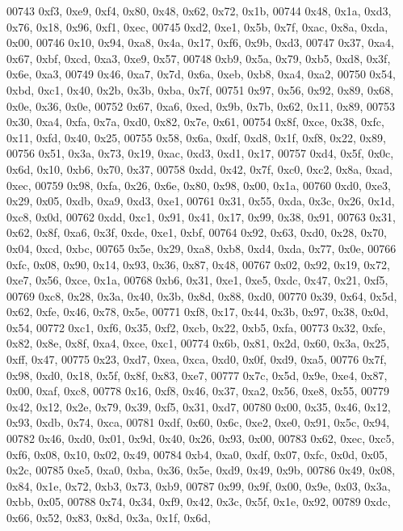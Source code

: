 \begin{DoxyCode}
00743   0xf3, 0xe9, 0xf4, 0x80, 0x48, 0x62, 0x72, 0x1b,
00744   0x48, 0x1a, 0xd3, 0x76, 0x18, 0x96, 0xf1, 0xec,
00745   0xd2, 0xe1, 0x5b, 0x7f, 0xac, 0x8a, 0xda, 0x00,
00746   0x10, 0x94, 0xa8, 0x4a, 0x17, 0xf6, 0x9b, 0xd3,
00747   0x37, 0xa4, 0x67, 0xbf, 0xcd, 0xa3, 0xe9, 0x57,
00748   0xb9, 0x5a, 0x79, 0xb5, 0xd8, 0x3f, 0x6e, 0xa3,
00749   0x46, 0xa7, 0x7d, 0x6a, 0xeb, 0xb8, 0xa4, 0xa2,
00750   0x54, 0xbd, 0xc1, 0x40, 0x2b, 0x3b, 0xba, 0x7f,
00751   0x97, 0x56, 0x92, 0x89, 0x68, 0x0e, 0x36, 0x0e,
00752   0x67, 0xa6, 0xed, 0x9b, 0x7b, 0x62, 0x11, 0x89,
00753   0x30, 0xa4, 0xfa, 0x7a, 0xd0, 0x82, 0x7e, 0x61,
00754   0x8f, 0xce, 0x38, 0xfc, 0x11, 0xfd, 0x40, 0x25,
00755   0x58, 0x6a, 0xdf, 0xd8, 0x1f, 0xf8, 0x22, 0x89,
00756   0x51, 0x3a, 0x73, 0x19, 0xac, 0xd3, 0xd1, 0x17,
00757   0xd4, 0x5f, 0x0c, 0x6d, 0x10, 0xb6, 0x70, 0x37,
00758   0xdd, 0x42, 0x7f, 0xc0, 0xc2, 0x8a, 0xad, 0xec,
00759   0x98, 0xfa, 0x26, 0x6e, 0x80, 0x98, 0x00, 0x1a,
00760   0xd0, 0xe3, 0x29, 0x05, 0xdb, 0xa9, 0xd3, 0xe1,
00761   0x31, 0x55, 0xda, 0x3c, 0x26, 0x1d, 0xc8, 0x0d,
00762   0xdd, 0xc1, 0x91, 0x41, 0x17, 0x99, 0x38, 0x91,
00763   0x31, 0x62, 0x8f, 0xa6, 0x3f, 0xde, 0xe1, 0xbf,
00764   0x92, 0x63, 0xd0, 0x28, 0x70, 0x04, 0xcd, 0xbc,
00765   0x5e, 0x29, 0xa8, 0xb8, 0xd4, 0xda, 0x77, 0x0e,
00766   0xfc, 0x08, 0x90, 0x14, 0x93, 0x36, 0x87, 0x48,
00767   0x02, 0x92, 0x19, 0x72, 0xe7, 0x56, 0xce, 0x1a,
00768   0xb6, 0x31, 0xe1, 0xe5, 0xdc, 0x47, 0x21, 0xf5,
00769   0xc8, 0x28, 0x3a, 0x40, 0x3b, 0x8d, 0x88, 0xd0,
00770   0x39, 0x64, 0x5d, 0x62, 0xfe, 0x46, 0x78, 0x5e,
00771   0xf8, 0x17, 0x44, 0x3b, 0x97, 0x38, 0x0d, 0x54,
00772   0xc1, 0xf6, 0x35, 0xf2, 0xcb, 0x22, 0xb5, 0xfa,
00773   0x32, 0xfe, 0x82, 0x8e, 0x8f, 0xa4, 0xce, 0xc1,
00774   0x6b, 0x81, 0x2d, 0x60, 0x3a, 0x25, 0xff, 0x47,
00775   0x23, 0xd7, 0xea, 0xca, 0xd0, 0x0f, 0xd9, 0xa5,
00776   0x7f, 0x98, 0xd0, 0x18, 0x5f, 0x8f, 0x83, 0xe7,
00777   0x7c, 0x5d, 0x9e, 0xe4, 0x87, 0x00, 0xaf, 0xc8,
00778   0x16, 0xf8, 0x46, 0x37, 0xa2, 0x56, 0xe8, 0x55,
00779   0x42, 0x12, 0x2e, 0x79, 0x39, 0xf5, 0x31, 0xd7,
00780   0x00, 0x35, 0x46, 0x12, 0x93, 0xdb, 0x74, 0xca,
00781   0xdf, 0x60, 0x6c, 0xe2, 0xe0, 0x91, 0x5c, 0x94,
00782   0x46, 0xd0, 0x01, 0x9d, 0x40, 0x26, 0x93, 0x00,
00783   0x62, 0xec, 0xc5, 0xf6, 0x08, 0x10, 0x02, 0x49,
00784   0xb4, 0xa0, 0xdf, 0x07, 0xfc, 0x0d, 0x05, 0x2c,
00785   0xe5, 0xa0, 0xba, 0x36, 0x5e, 0xd9, 0x49, 0x9b,
00786   0x49, 0x08, 0x84, 0x1e, 0x72, 0xb3, 0x73, 0xb9,
00787   0x99, 0x9f, 0x00, 0x9e, 0x03, 0x3a, 0xbb, 0x05,
00788   0x74, 0x34, 0xf9, 0x42, 0x3c, 0x5f, 0x1e, 0x92,
00789   0xdc, 0x66, 0x52, 0x83, 0x8d, 0x3a, 0x1f, 0x6d,

\end{DoxyCode}
